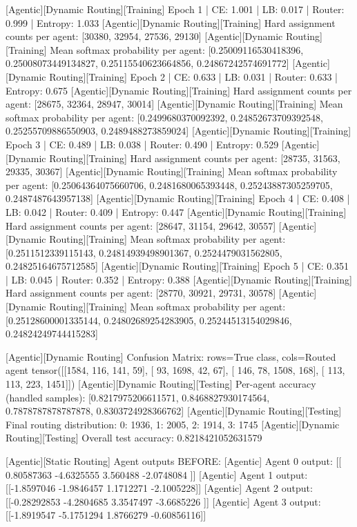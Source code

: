 [Agentic][Dynamic Routing][Training] Epoch 1 | CE: 1.001 | LB: 0.017 | Router: 0.999 | Entropy: 1.033
[Agentic][Dynamic Routing][Training] Hard assignment counts per agent: [30380, 32954, 27536, 29130]
[Agentic][Dynamic Routing][Training] Mean softmax probability per agent: [0.25009116530418396, 0.25008073449134827, 0.25115540623664856, 0.24867242574691772]
[Agentic][Dynamic Routing][Training] Epoch 2 | CE: 0.633 | LB: 0.031 | Router: 0.633 | Entropy: 0.675
[Agentic][Dynamic Routing][Training] Hard assignment counts per agent: [28675, 32364, 28947, 30014]
[Agentic][Dynamic Routing][Training] Mean softmax probability per agent: [0.2499680370092392, 0.24852673709392548, 0.25255709886550903, 0.2489488273859024]
[Agentic][Dynamic Routing][Training] Epoch 3 | CE: 0.489 | LB: 0.038 | Router: 0.490 | Entropy: 0.529
[Agentic][Dynamic Routing][Training] Hard assignment counts per agent: [28735, 31563, 29335, 30367]
[Agentic][Dynamic Routing][Training] Mean softmax probability per agent: [0.25064364075660706, 0.2481680065393448, 0.25243887305259705, 0.2487487643957138]
[Agentic][Dynamic Routing][Training] Epoch 4 | CE: 0.408 | LB: 0.042 | Router: 0.409 | Entropy: 0.447
[Agentic][Dynamic Routing][Training] Hard assignment counts per agent: [28647, 31154, 29642, 30557]
[Agentic][Dynamic Routing][Training] Mean softmax probability per agent: [0.2511512339115143, 0.24814939498901367, 0.2524479031562805, 0.24825164675712585]
[Agentic][Dynamic Routing][Training] Epoch 5 | CE: 0.351 | LB: 0.045 | Router: 0.352 | Entropy: 0.388
[Agentic][Dynamic Routing][Training] Hard assignment counts per agent: [28770, 30921, 29731, 30578]
[Agentic][Dynamic Routing][Training] Mean softmax probability per agent: [0.25128600001335144, 0.24802689254283905, 0.25244513154029846, 0.24824249744415283]

[Agentic][Dynamic Routing] Confusion Matrix: rows=True class, cols=Routed agent
tensor([[1584,  116,  141,   59],
[  93, 1698,   42,   67],
[ 146,   78, 1508,  168],
[ 113,  113,  223, 1451]])
[Agentic][Dynamic Routing][Testing] Per-agent accuracy (handled samples): [0.8217975206611571, 0.8468827930174564, 0.7878787878787878, 0.8303724928366762]
[Agentic][Dynamic Routing][Testing] Final routing distribution: {0: 1936, 1: 2005, 2: 1914, 3: 1745}
[Agentic][Dynamic Routing][Testing] Overall test accuracy: 0.8218421052631579

[Agentic][Static Routing] Agent outputs BEFORE:
[Agentic] Agent 0 output: [[ 0.80587363 -4.6325555   3.560488   -2.0748084 ]]
[Agentic] Agent 1 output: [[-1.8597046 -1.9846457  1.1712271 -2.1005228]]
[Agentic] Agent 2 output: [[-0.28292853 -4.2804685   3.3547497  -3.6685226 ]]
[Agentic] Agent 3 output: [[-1.8919547  -5.1751294   1.8766279  -0.60856116]]

